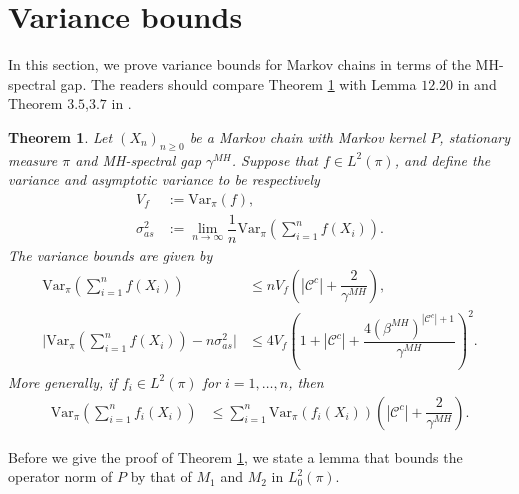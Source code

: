 \documentclass[12pt,a4]{amsart}
\numberwithin{equation}{section}
\theoremstyle{plain}
\newtheorem{theorem}{Theorem}[section]
\theoremstyle{definition}
\theoremstyle{remark}
\newcommand{\1}{\mathds{1}}
\renewcommand{\leq}{\leqslant}
\renewcommand{\geq}{\geqslant}
\begin{document}
\section{Variance bounds}\label{sec:varbd}

In this section, we prove variance bounds for Markov chains in terms of the MH-spectral gap. The readers should compare Theorem \ref{thm:varbd} with Lemma $12.20$ in \cite{LPW09} and Theorem $3.5$,$3.7$ in \cite{Paulin15}.


\begin{theorem}\label{thm:varbd}
	Let $(X_n)_{n \geq 0}$ be a Markov chain with Markov kernel $P$, stationary measure $\pi$ and MH-spectral gap $\gamma^{MH}$. Suppose that $f \in L^2(\pi)$, and define the variance and asymptotic variance to be respectively
	\begin{align*}
		V_f &:= \mathrm{Var}_{\pi}(f), \\
		\sigma_{as}^2 &:= \lim_{n \to \infty} \dfrac{1}{n} \mathrm{Var}_{\pi} \left(\sum_{i=1}^n f(X_i) \right).
	\end{align*}
	The variance bounds are given by
	\begin{align}
		\mathrm{Var}_{\pi} \left(\sum_{i=1}^n f(X_i) \right) &\leq n V_f \left(|\mathcal{C}^c|+ \dfrac{2}{\gamma^{MH}} \right), \label{eq:varbd} \\
		\bigg| \mathrm{Var}_{\pi} \left(\sum_{i=1}^n f(X_i) \right) - n \sigma_{as}^2 \bigg| &\leq 4 V_f \left(1 + |\mathcal{C}^c| + \dfrac{4 (\beta^{MH})^{|\mathcal{C}^c| +1}}{\gamma^{MH}} \right)^2. \label{eq:varbdas}
	\end{align}
	More generally, if $f_i \in L^2(\pi)$ for $i=1,\ldots,n$, then
	\begin{align}
		\mathrm{Var}_{\pi} \left(\sum_{i=1}^n f_i(X_i) \right) &\leq \sum_{i=1}^n \mathrm{Var}_{\pi}(f_i(X_i)) \left(|\mathcal{C}^c|+ \dfrac{2}{\gamma^{MH}} \right). \label{eq:varbdg}
	\end{align}
\end{theorem}


Before we give the proof of Theorem \ref{thm:varbd}, we state a lemma that bounds the operator norm of $P$ by that of $M_1$ and $M_2$ in $L^2_0(\pi)$.
\end{document}
